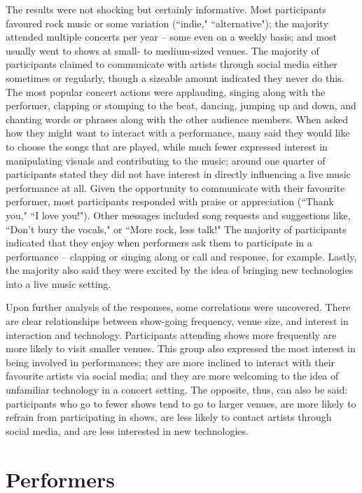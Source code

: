 The results were not shocking but certainly informative. Most participants favoured rock music or some variation (``indie," ``alternative"); the majority attended multiple concerts per year -- some even on a weekly basis; and most usually went to shows at small- to medium-sized venues. The majority of participants claimed to communicate with artists through social media either sometimes or regularly, though a sizeable amount indicated they never do this. The most popular concert actions were applauding, singing along with the performer, clapping or stomping to the beat, dancing, jumping up and down, and chanting words or phrases along with the other audience members. When asked how they might want to interact with a performance, many said they would like to choose the songs that are played, while much fewer expressed interest in manipulating visuals and contributing to the music; around one quarter of participants stated they did not have interest in directly influencing a live music performance at all. Given the opportunity to communicate with their favourite performer, most participants responded with praise or appreciation (``Thank you," ``I love you!"). Other messages included song requests and suggestions like, ``Don't bury the vocals," or ``More rock, less talk!" The majority of participants indicated that they enjoy when performers ask them to participate in a performance -- clapping or singing along or call and response, for example. Lastly, the majority also said they were excited by the idea of bringing new technologies into a live music setting.

Upon further analysis of the responses, some correlations were uncovered. There are clear relationships between show-going frequency, venue size, and interest in interaction and technology. Participants attending shows more frequently are more likely to visit smaller venues. This group also expressed the most interest in being involved in performances; they are more inclined to interact with their favourite artists via social media; and they are more welcoming to the idea of unfamiliar technology in a concert setting. The opposite, thus, can also be said: participants who go to fewer shows tend to go to larger venues, are more likely to refrain from participating in shows, are less likely to contact artists through social media, and are less interested in new technologies.


\section{Performers}

